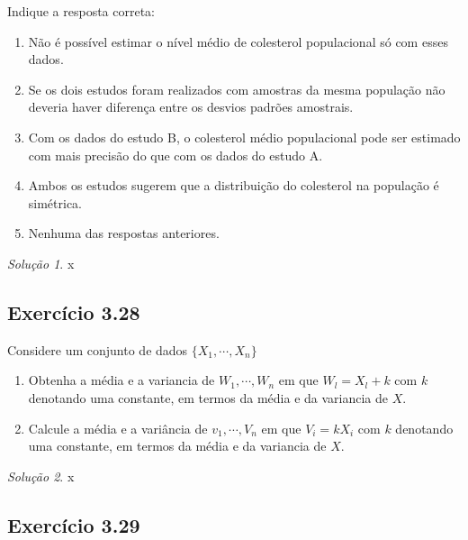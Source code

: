 \documentclass[
]{latex/krantz}
\providecommand{\tightlist}{%
  \setlength{\itemsep}{0pt}\setlength{\parskip}{0pt}}
\theoremstyle{definition}
\theoremstyle{definition}
\theoremstyle{definition}
\theoremstyle{definition}
\theoremstyle{remark}
\newtheorem*{solution}{Solução}
\begin{document}
Indique a resposta correta:

\begin{enumerate}
\def\labelenumi{\alph{enumi})}
\tightlist
\item
  Não é possível estimar o nível médio de colesterol populacional só com esses dados.
\item
  Se os dois estudos foram realizados com amostras da mesma população não deveria haver diferença entre os desvios padrões amostrais.
\item
  Com os dados do estudo B, o colesterol médio populacional pode ser estimado com mais precisão do que com os dados do estudo A.
\item
  Ambos os estudos sugerem que a distribuição do colesterol na população é simétrica.
\item
  Nenhuma das respostas anteriores.
\end{enumerate}

\begin{solution}
x
\end{solution}

\hypertarget{exr3-28}{%
\subsection*{Exercício 3.28}\label{exr3-28}}

Considere um conjunto de dados \(\{X_{1}, \cdots , X_{n}\}\)

\begin{enumerate}
\def\labelenumi{\alph{enumi})}
\tightlist
\item
  Obtenha a média e a variancia de \(W_{1}, \cdots , W_{n}\) em que \(W_{l} = X_{l} + k\) com \(k\) denotando uma constante, em termos da média e da variancia de \(X\).
\item
  Calcule a média e a variância de \(v_{1}, \cdots , V_{n}\) em que \(V_{i} = kX_{i}\) com \(k\) denotando uma constante, em termos da média e da variancia de \(X\).
\end{enumerate}

\begin{solution}
x
\end{solution}

\hypertarget{exr3-29}{%
\subsection*{Exercício 3.29}\label{exr3-29}}
\end{document}
